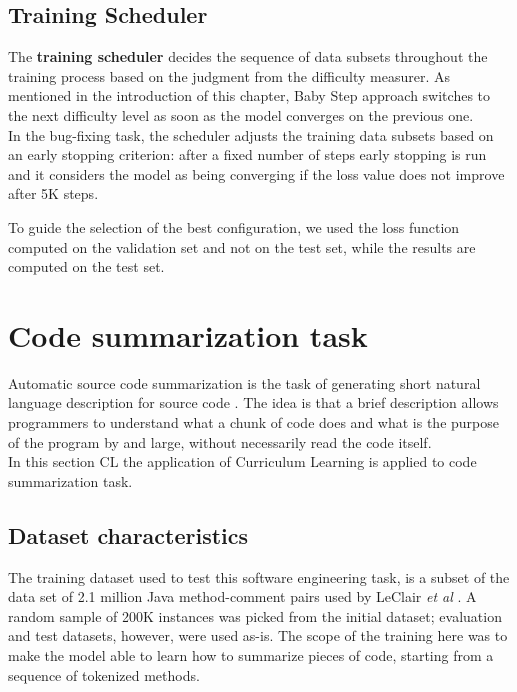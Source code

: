 
\subsection{Training Scheduler}
\label{scheduling-bf}
The \textbf{training scheduler} decides the sequence of data subsets throughout the training process based
on the judgment from the difficulty measurer. As mentioned in the introduction of this chapter, Baby Step approach switches to the next difficulty level
as soon as the model converges on the previous one.\\ 
In the bug-fixing task, the scheduler adjusts
the training data subsets based on an early stopping criterion: after a fixed number of steps
early stopping is run and it considers the model as being converging if the loss value
does not improve after 5K steps.

To guide the selection of the best configuration, we used the loss function computed on the validation set
and not on the test set, while the results are computed on the test set.

\section{Code summarization task}
Automatic source code summarization is the task of generating short natural language description 
for source code \cite{Leclair2020}. The idea is that a brief description allows programmers to understand
what a chunk of code does and what is the purpose of the program by and large, without necessarily read the code 
itself.\\
In this section CL the application of Curriculum Learning is applied to code summarization task.

\subsection{Dataset characteristics}
The training dataset used to test this software engineering task, is a subset of the data set of 2.1 million 
Java method-comment pairs used by LeClair \textit{et al} \cite{Leclair2020}. A random sample of 200K instances was picked from
the initial dataset; evaluation and test datasets, however, were used as-is. The scope of the training here 
was to make the model able to learn how to summarize pieces of code, starting from a sequence of tokenized methods.

